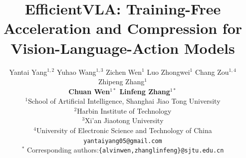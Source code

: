 \documentclass{article}
\title{EfficientVLA: Training-Free Acceleration and Compression for Vision-Language-Action Models}
\author{%
  Yantai Yang$^{1,2}$ Yuhao Wang$^{1,3}$ Zichen Wen$^1$   Luo Zhongwei$^1$ Chang Zou$^{1,4}$ Zhipeng Zhang$^1$ \\
  \textbf{Chuan Wen$^{1*}$   Linfeng Zhang$^{1*}$} \\
  $^1$School of Artificial Intelligence, Shanghai Jiao Tong University   \\ 
  $^2$Harbin Institute of Technology \\
  $^3$Xi'an Jiaotong University \\
  $^4$University of Electronic Science and Technology of China \\
   \texttt{yantaiyang05@gmail.com} \\
  $^*$ Corresponding authors:\texttt{\{alvinwen,zhanglinfeng\}@sjtu.edu.cn} 
}
\newcommand{\1}{{\bf 1}}  %
\newcommand{\0}{{\bf 0}}  %
\begin{document}
\maketitle











\newpage
{
    \small
    
    
}


\appendix

\newpage



\newpage



\end{document}
